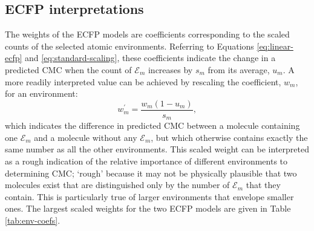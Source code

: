\subsection{ECFP interpretations}

The weights of the ECFP models are coefficients corresponding to the scaled counts of the selected atomic environments. Referring to Equations \ref{eq:linear-ecfp} and \ref{eq:standard-scaling}, these coefficients indicate
the change in a predicted CMC when the count of $\mathcal{E}_m$ increases by $s_m$ from its average, $u_m$. A more readily interpreted value can be achieved by rescaling the coefficient, $w_m$, for an environment:
\begin{equation}
    w_m^\prime = \frac{w_m(1 - u_m)}{s_m},
\end{equation}
which indicates the difference in predicted CMC between a molecule containing
one $\mathcal{E}_m$ and a molecule without any $\mathcal{E}_m$, but which
otherwise contains exactly the same number as all the other environments. This
scaled weight can be interpreted as a rough indication of the relative
importance of different environments to determining CMC; `rough' because it may
not be physically plausible that two molecules exist that are distinguished only
by the number of $\mathcal{E}_m$ that they contain. This is particularly true of
larger environments that envelope smaller ones. The largest scaled weights for
the two ECFP models are given in Table \ref{tab:env-coefs}.

